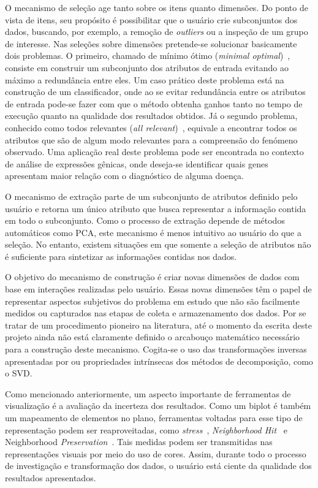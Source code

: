 O mecanismo de seleção age tanto sobre os itens quanto
dimensões. Do ponto de vista de itens, seu propósito é
possibilitar que o usuário crie subconjuntos dos dados,
buscando, por exemplo, a remoção de \emph{outliers} ou a
inspeção de um grupo de interesse. Nas seleções sobre
dimensões pretende-se solucionar basicamente dois problemas. O
primeiro, chamado de mínimo ótimo (\emph{minimal
optimal})~\cite{Kohavi1997}, consiste em construir um
subconjunto dos atributos de entrada evitando ao máximo a
redundância entre eles. Um caso prático deste problema está
na construção de um classificador, onde ao se evitar
redundância entre os atributos de entrada pode-se fazer com
que o método obtenha ganhos tanto no tempo de execução
quanto na qualidade dos resultados obtidos. Já o segundo
problema, conhecido como todos relevantes (\emph{all
relevant})~\cite{Nilsson2007}, equivale a encontrar todos os
atributos que são de algum modo relevantes para a
compreensão do fenómeno observado. Uma aplicação real deste
problema pode ser encontrada no contexto de análise de
expressões gênicas, onde deseja-se identificar quais genes
apresentam maior relação com o diagnóstico de alguma doença. 

O mecanismo de extração parte de um subconjunto de atributos
definido pelo usuário e retorna um único atributo que busca
representar a informação contida em todo o subconjunto. Como
o processo de extração depende de métodos automáticos como
PCA, este mecanismo é menos intuitivo ao usuário do que a
seleção. No entanto, existem situações em que somente a
seleção de atributos não é suficiente para sintetizar as
informações contidas nos dados.

O objetivo do mecanismo de construção é criar novas
dimensões de dados com base em interações realizadas pelo
usuário. Essas novas dimensões têm o papel de representar
aspectos subjetivos do problema em estudo que não são
facilmente medidos ou capturados nas etapas de coleta e
armazenamento dos dados. Por se tratar de um procedimento
pioneiro na literatura, até o momento da escrita deste
projeto ainda não está claramente definido o arcabouço
matemático necessário para a construção deste mecanismo.
Cogita-se o uso das transformações inversas apresentadas por
\cite{Gladys2013} ou propriedades intrínsecas dos métodos de
decomposição, como o SVD.

Como mencionado anteriormente, um aspecto importante de
ferramentas de visualização é a avaliação da incerteza dos
resultados. Como um biplot é também um mapeamento de
elementos no plano, ferramentas voltadas para esse tipo de
representação podem ser reaproveitadas, como
\emph{stress}~\cite{Kruskal1964}, \emph{Neighborhood
Hit}~\cite{Paulovich2008} e Neighborhood
\emph{Preservation}~\cite{Paulovich2008a}. Tais medidas
podem ser transmitidas nas representações visuais por meio
do uso de cores. Assim, durante todo o processo de
investigação e transformação dos dados, o usuário está
ciente da qualidade dos resultados apresentados. 


